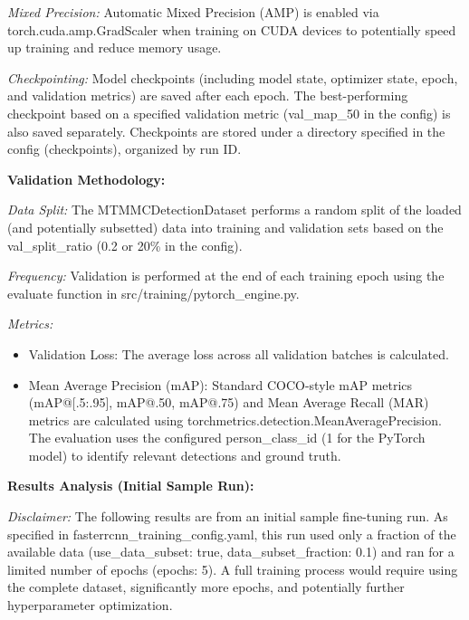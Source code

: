\textit{Mixed Precision:} Automatic Mixed Precision (AMP) is enabled via torch.cuda.amp.GradScaler when training on CUDA devices to potentially speed up training and reduce memory usage.

\textit{Checkpointing:} Model checkpoints (including model state, optimizer state, epoch, and validation metrics) are saved after each epoch. The best-performing checkpoint based on a specified validation metric (val\_map\_50 in the config) is also saved separately. Checkpoints are stored under a directory specified in the config (checkpoints), organized by run ID.

\textbf{Validation Methodology:}

\textit{Data Split:} The MTMMCDetectionDataset performs a random split of the loaded (and potentially subsetted) data into training and validation sets based on the val\_split\_ratio (0.2 or 20\% in the config).

\textit{Frequency:} Validation is performed at the end of each training epoch using the evaluate function in src/training/pytorch\_engine.py.

\textit{Metrics:}
\begin{itemize}
    \item Validation Loss: The average loss across all validation batches is calculated.
    \item Mean Average Precision (mAP): Standard COCO-style mAP metrics (mAP@[.5:.95], mAP@.50, mAP@.75) and Mean Average Recall (MAR) metrics are calculated using torchmetrics.detection.MeanAveragePrecision. The evaluation uses the configured person\_class\_id (1 for the PyTorch model) to identify relevant detections and ground truth.
\end{itemize}

\textbf{Results Analysis (Initial Sample Run):}

\textit{Disclaimer:} The following results are from an initial sample fine-tuning run. As specified in fasterrcnn\_training\_config.yaml, this run used only a fraction of the available data (use\_data\_subset: true, data\_subset\_fraction: 0.1) and ran for a limited number of epochs (epochs: 5). A full training process would require using the complete dataset, significantly more epochs, and potentially further hyperparameter optimization.

